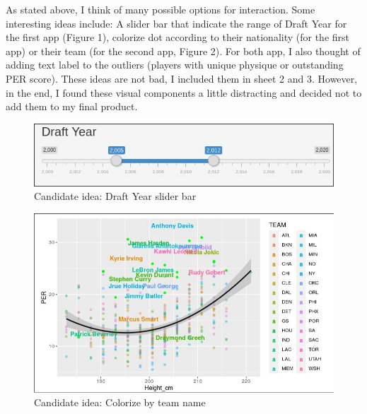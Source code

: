 \documentclass[a4paper,12pt,twoside]{article}
\numberwithin{equation}{section}
\begin{document}
As stated above, I think of many possible options for interaction. Some interesting ideas include: A slider bar that indicate the range of Draft Year for the first app (Figure 1), colorize dot according to their nationality (for the first app) or their team (for the second app, Figure 2). For both app, I also thought of adding text label to the outliers (players with unique physique or outstanding PER score). These ideas are not bad, I included them in sheet 2 and 3. However, in the end, I found these visual components a little distracting and decided not to add them to my final product.
\begin{figure}[h]
\caption{Candidate idea: Draft Year slider bar}
\includegraphics[scale=0.35]{op11.jpg}
\centering
\end{figure}
\begin{figure}[h]
\caption{Candidate idea: Colorize by team name}
\includegraphics[scale=0.35]{op12.jpg}
\centering
\end{figure}
\end{document}
